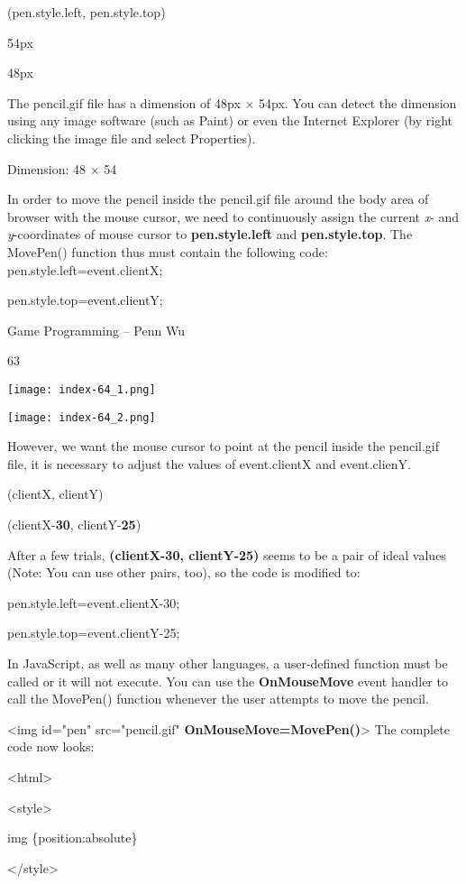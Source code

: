 \documentclass[
]{article}
\begin{document}
(pen.style.left, pen.style.top)

54px

48px

The pencil.gif file has a dimension of 48px × 54px. You can detect the
dimension using any image software (such as Paint) or even the Internet
Explorer (by right clicking the image file and select Properties).

Dimension: 48 × 54

In order to move the pencil inside the pencil.gif file around the body
area of browser with the mouse cursor, we need to continuously assign
the current \emph{x}- and \emph{y}-coordinates of mouse cursor to
\textbf{pen.style.left} and \textbf{pen.style.top}. The MovePen()
function thus must contain the following code:
pen.style.left=event.clientX;

pen.style.top=event.clientY;

Game Programming -- Penn Wu

63

\protect\hypertarget{index_split_005.htmlux5cux23p64}{}{}\texttt{[image: index-64\_1.png]}

\texttt{[image: index-64\_2.png]}

However, we want the mouse cursor to point at the pencil inside the
pencil.gif file, it is necessary to adjust the values of event.clientX
and event.clienY.

(clientX, clientY)

(clientX-\textbf{30}, clientY-\textbf{25})

After a few trials, \textbf{(clientX-30, clientY-25)} seems to be a pair
of ideal values (Note: You can use other pairs, too), so the code is
modified to:

pen.style.left=event.clientX-30;

pen.style.top=event.clientY-25;

In JavaScript, as well as many other languages, a user-defined function
must be called or it will not execute. You can use the
\textbf{OnMouseMove} event handler to call the MovePen() function
whenever the user attempts to move the pencil.

\textless img id="pen" src="pencil.gif"
\textbf{OnMouseMove=MovePen()}\textgreater{} The complete code now
looks:

\textless html\textgreater{}

\textless style\textgreater{}

img \{position:absolute\}

\textless/style\textgreater{}
\end{document}
